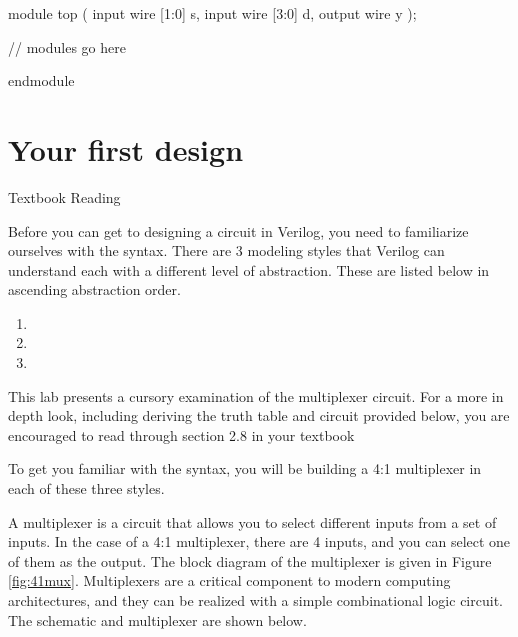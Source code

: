 \documentclass[12pt]{labmanual}
\begin{document}
\begin{codeblock}[language=verilog]
module top (
    input wire [1:0] s,
    input wire [3:0] d,
    output wire y
);

    // modules go here

endmodule
\end{codeblock}

\section{Your first design}
\label{sec:mux-design}

\begin{aside}[0.5,0.5]{Textbook Reading}
\begin{leftcontent}    
Before you can get to designing a circuit in Verilog, you need to familiarize ourselves with the syntax. There are 3 modeling styles that Verilog can understand each with a different level of abstraction. These are listed below in ascending abstraction order.
\begin{enumerate}
    \item {}
    \item {}
    \item {}
\end{enumerate}
\end{leftcontent}
\begin{rightcontent}
    This lab presents a cursory examination of the multiplexer circuit. For a more in depth look, including deriving the truth table and circuit provided below, you are encouraged to read through section 2.8 in your textbook
\end{rightcontent}
\end{aside}

To get you familiar with the syntax, you will be building a 4:1 multiplexer in each of these three styles.

A multiplexer is a circuit that allows you to select different inputs from a set of inputs. In the case of a 4:1 multiplexer, there are 4 inputs, and you can select one of them as the output. 
The block diagram of the multiplexer is given in Figure \ref{fig:41mux}. Multiplexers are a critical component to modern computing architectures, and they can be realized with a simple combinational logic circuit. The schematic and multiplexer are shown below.
\clearpage
\end{document}
